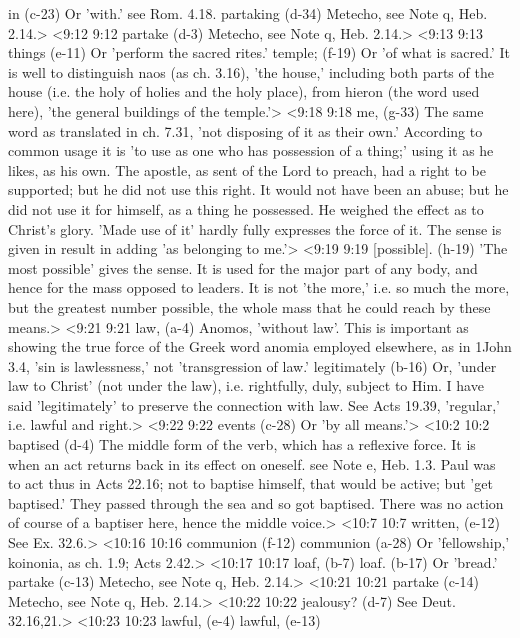   in (c-23)  Or 'with.' see Rom. 4.18.
  partaking (d-34)  Metecho, see Note q, Heb. 2.14.>
<9:12 9:12  partake (d-3)  Metecho, see Note q, Heb. 2.14.>
<9:13 9:13  things (e-11)  Or 'perform the sacred rites.'
  temple; (f-19)  Or 'of what is sacred.' It is well to distinguish naos (as  ch. 3.16), 'the house,' including both parts of the house (i.e.  the holy of holies and the holy place), from hieron (the word  used here), 'the general buildings of the temple.'>
<9:18 9:18  me, (g-33)  The same word as translated in ch. 7.31, 'not disposing of it  as their own.' According to common usage it is 'to use as one  who has possession of a thing;' using it as he likes, as his  own. The apostle, as sent of the Lord to preach, had a right to  be supported; but he did not use this right. It would not have  been an abuse; but he did not use it for himself, as a thing he  possessed. He weighed the effect as to Christ's glory. 'Made  use of it' hardly fully expresses the force of it. The sense is  given in result in adding 'as belonging to me.'>
<9:19 9:19  [possible]. (h-19)  'The most possible' gives the sense. It is used for the major  part of any body, and hence for the mass opposed to leaders. It  is not 'the more,' i.e. so much the more, but the greatest  number possible, the whole mass that he could reach by these  means.>
<9:21 9:21  law, (a-4)  Anomos, 'without law'. This is important as showing the  true force of the Greek word anomia employed elsewhere, as in  1John 3.4, 'sin is lawlessness,' not 'transgression of law.'
  legitimately (b-16)  Or, 'under law to Christ' (not under the law), i.e.  rightfully, duly, subject to Him. I have said 'legitimately' to  preserve the connection with law. See Acts 19.39, 'regular,'  i.e. lawful and right.>
<9:22 9:22  events (c-28)  Or 'by all means.'>
<10:2 10:2  baptised (d-4)  The middle form of the verb, which has a reflexive force. It  is when an act returns back in its effect on oneself. see Note  e, Heb. 1.3. Paul was to act thus in Acts 22.16; not to baptise  himself, that would be active; but 'get baptised.' They passed  through the sea and so got baptised. There was no action of  course of a baptiser here, hence the middle voice.>
<10:7 10:7  written, (e-12)  See Ex. 32.6.>
<10:16 10:16  communion (f-12)  communion (a-28)
  Or 'fellowship,' koinonia, as ch. 1.9; Acts 2.42.>
<10:17 10:17  loaf, (b-7)  loaf. (b-17)  Or 'bread.'
  partake (c-13)  Metecho, see Note q, Heb. 2.14.>
<10:21 10:21  partake (c-14)  Metecho, see Note q, Heb. 2.14.>
<10:22 10:22  jealousy? (d-7)  See Deut. 32.16,21.>
<10:23 10:23  lawful, (e-4)  lawful, (e-13)
